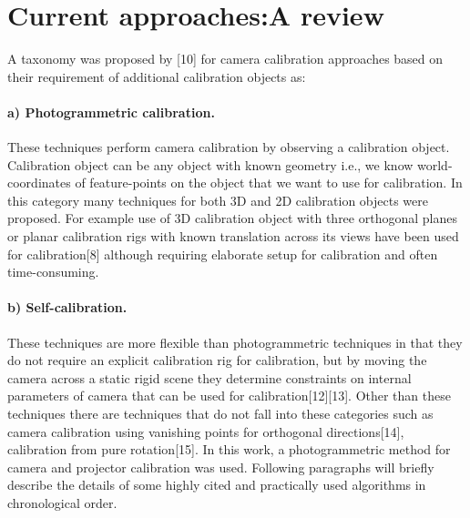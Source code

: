   
  
\section{Current approaches:A review}  
A taxonomy was proposed by [10] for camera calibration approaches based on their requirement of additional calibration objects as:  
\paragraph{a) Photogrammetric calibration.}  
These techniques perform camera calibration by observing a calibration object. Calibration object can be any object with known geometry i.e., we know world-coordinates of feature-points on the object that we want to use for calibration. In this category many techniques for both 3D and 2D calibration objects were proposed. For example use of 3D calibration object with three orthogonal planes or planar calibration rigs with known translation across its views have been used for calibration[8] although requiring elaborate setup for calibration and often time-consuming.  
\paragraph{b) Self-calibration.}  
These techniques are more flexible than photogrammetric techniques in that they do not require an explicit calibration rig for calibration, but by moving the camera across a static rigid scene they determine constraints on internal parameters of camera that can be used for calibration[12][13]. Other than these techniques there are techniques that do not fall into these categories
such as camera calibration using vanishing points for orthogonal directions[14], calibration from pure rotation[15]. In this work, a photogrammetric method for camera and projector calibration was used. Following paragraphs will briefly describe the details of some highly cited and practically used algorithms in chronological order.\newline  
  
